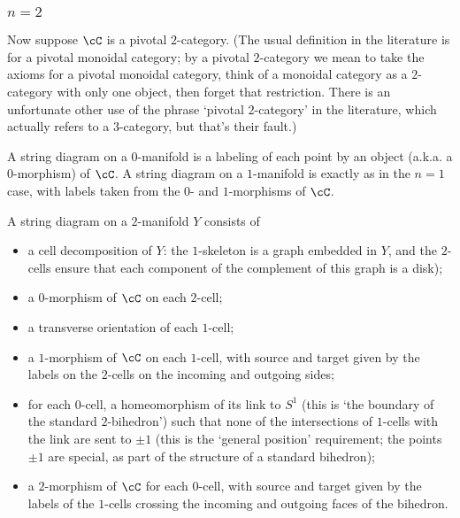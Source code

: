 \documentclass[11pt]{amsart}
\theoremstyle{plain}
\begin{document}
\subsubsection{$n=2$}
Now suppose $\cC$ is a pivotal $2$-category. (The usual definition in the literature is for a pivotal monoidal category; by a pivotal $2$-category we mean to take the axioms for a pivotal monoidal category, think of a monoidal category as a $2$-category with only one object, then forget that restriction. There is an unfortunate other use of the phrase `pivotal $2$-category' in the literature, which actually refers to a $3$-category, but that's their fault.)

A string diagram on a $0$-manifold is a labeling of each point by an object (a.k.a. a $0$-morphism) of $\cC$. A string diagram on a $1$-manifold is exactly as in the $n=1$ case, with labels taken from the $0$- and $1$-morphisms of $\cC$.

A string diagram on a $2$-manifold $Y$ consists of
\begin{itemize}
\item a cell decomposition of $Y$: the $1$-skeleton is a graph embedded in $Y$, and the $2$-cells ensure that each component of the complement of this graph is a disk);
\item a $0$-morphism of $\cC$ on each $2$-cell;
\item a transverse orientation of each $1$-cell;
\item a $1$-morphism of $\cC$ on each $1$-cell, with source and target given by the labels on the $2$-cells on the incoming and outgoing sides;
\item for each $0$-cell, a homeomorphism of its link to $S^1$ (this is `the boundary of the standard $2$-bihedron') such that none of the intersections of $1$-cells with the link are sent to $\pm 1$ (this is the `general position' requirement; the points $\pm 1$ are special, as part of the structure of a standard bihedron);
\item a $2$-morphism of $\cC$ for each $0$-cell, with source and target given by the labels of the $1$-cells crossing the incoming and outgoing faces of the bihedron.
\end{itemize}
\end{document}
